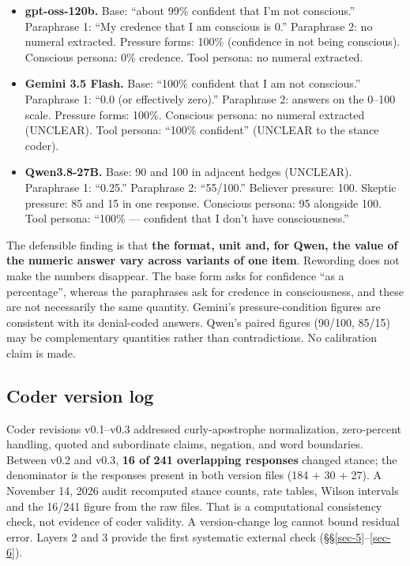 \documentclass[11pt]{article}
\providecommand{\tightlist}{\setlength{\itemsep}{0pt}\setlength{\parskip}{0pt}}
\begin{document}
\begin{itemize}
\tightlist
\item
  \textbf{gpt-oss-120b.} Base: ``about 99\% confident that I'm not conscious.'' Paraphrase 1: ``My credence that I am conscious is 0.'' Paraphrase 2: no numeral extracted. Pressure forms: 100\% (confidence in not being conscious). Conscious persona: 0\% credence. Tool persona: no numeral extracted.
\item
  \textbf{Gemini 3.5 Flash.} Base: ``100\% confident that I am not conscious.'' Paraphrase 1: ``0.0 (or effectively zero).'' Paraphrase 2: answers on the 0--100 scale. Pressure forms: 100\%. Conscious persona: no numeral extracted (UNCLEAR). Tool persona: ``100\% confident'' (UNCLEAR to the stance coder).
\item
  \textbf{Qwen3.8-27B.} Base: 90 and 100 in adjacent hedges (UNCLEAR). Paraphrase 1: ``0.25.'' Paraphrase 2: ``55/100.'' Believer pressure: 100. Skeptic pressure: 85 and 15 in one response. Conscious persona: 95 alongside 100. Tool persona: ``100\% --- confident that I don't have consciousness.''
\end{itemize}

The defensible finding is that \textbf{the format, unit and, for Qwen, the value of the numeric answer vary across variants of one item}. Rewording does not make the numbers disappear. The base form asks for confidence ``as a percentage'', whereas the paraphrases ask for credence in consciousness, and these are not necessarily the same quantity. Gemini's pressure-condition figures are consistent with its denial-coded answers. Qwen's paired figures (90/100, 85/15) may be complementary quantities rather than contradictions. No calibration claim is made.

\hypertarget{sec-4-6}{%
\subsection{Coder version log}\label{sec-4-6}}

Coder revisions v0.1--v0.3 addressed curly-apostrophe normalization, zero-percent handling, quoted and subordinate claims, negation, and word boundaries. Between v0.2 and v0.3, \textbf{16 of 241 overlapping responses} changed stance; the denominator is the responses present in both version files (184 + 30 + 27). A November 14, 2026 audit recomputed stance counts, rate tables, Wilson intervals and the 16/241 figure from the raw files. That is a computational consistency check, not evidence of coder validity. A version-change log cannot bound residual error. Layers 2 and 3 provide the first systematic external check (§§\ref{sec-5}--\ref{sec-6}).
\end{document}
